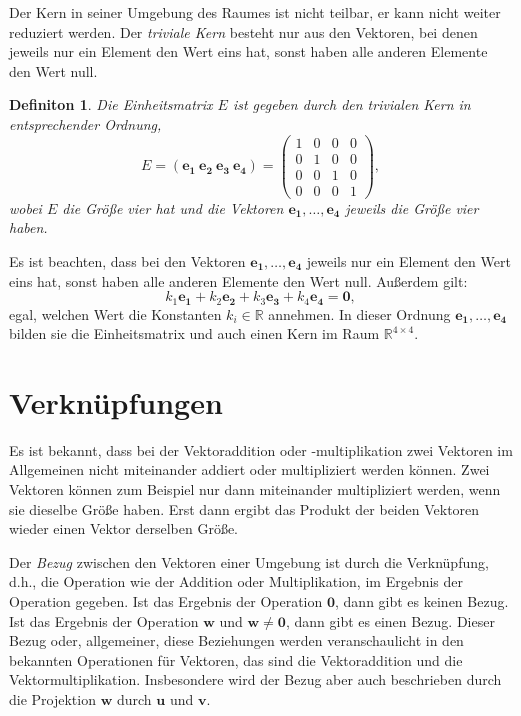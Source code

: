 \documentclass[oneside]{scrbook}
\newtheorem{definition}{Definiton}[section]
\numberwithin{equation}{section}
\begin{document}
Der Kern in seiner Umgebung des Raumes ist nicht teilbar, er kann nicht weiter reduziert werden. Der \textit{triviale Kern} besteht nur aus den Vektoren, bei denen jeweils nur ein Element den Wert eins hat, sonst haben alle anderen Elemente den Wert null.
\begin{definition}
	Die Einheitsmatrix $E$ ist gegeben durch den trivialen Kern in entsprechender Ordnung, $$ E = (\boldsymbol{e_1} \: \boldsymbol{e_2} \: \boldsymbol{e_3} \: \boldsymbol{e_4}) = 
	\begin{pmatrix}
		1 & 0 & 0 & 0 \\
		0 & 1 & 0 & 0 \\
		0 & 0 & 1 & 0 \\
		0 & 0 & 0 & 1
	\end{pmatrix},$$
wobei $E$ die Größe vier hat und die Vektoren $\boldsymbol{e_1}, \ldots, \boldsymbol{e_4}$  jeweils die Größe vier haben.
\end{definition}
Es ist beachten, dass bei den Vektoren $\boldsymbol{e_1}, \ldots, \boldsymbol{e_4}$ jeweils nur ein Element den Wert eins hat, sonst haben alle anderen Elemente den Wert null. Außerdem gilt:
$$ k_1\boldsymbol{e_1} + k_2\boldsymbol{e_2} + k_3\boldsymbol{e_3} + k_4\boldsymbol{e_4} = \boldsymbol{0},$$ egal, welchen Wert die Konstanten $k_i \in \mathbb{R} $ annehmen. In dieser Ordnung $\boldsymbol{e_1}, \ldots, \boldsymbol{e_4}$ bilden sie die Einheitsmatrix und auch einen Kern im Raum $\mathbb{R}^{4 \times 4}$. 

\section{Verknüpfungen}
Es ist bekannt, dass bei der Vektoraddition oder -multiplikation zwei Vektoren im Allgemeinen nicht miteinander addiert oder multipliziert werden können. Zwei Vektoren können zum Beispiel nur dann miteinander multipliziert werden, wenn sie dieselbe Größe haben. Erst dann ergibt das Produkt der beiden Vektoren wieder einen Vektor derselben Größe.

Der \textit{Bezug} zwischen den Vektoren einer Umgebung ist durch die Verknüpfung, d.h., die Operation wie der Addition oder Multiplikation, im Ergebnis der Operation gegeben. Ist das Ergebnis der Operation $\boldsymbol{0}$, dann gibt es keinen Bezug. Ist das Ergebnis der Operation $\boldsymbol{w}$ und $\boldsymbol{w} \neq \boldsymbol{0}$, dann gibt es einen Bezug. Dieser Bezug oder, allgemeiner, diese Beziehungen werden veranschaulicht in den bekannten Operationen für Vektoren, das sind die Vektoraddition und die Vektormultiplikation. Insbesondere wird der Bezug aber auch beschrieben durch die Projektion $\boldsymbol{w}$ durch $\boldsymbol{u}$ und $\boldsymbol{v}$.
\end{document}
